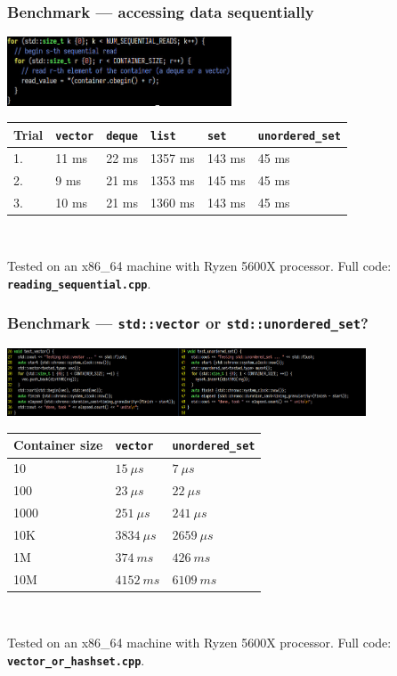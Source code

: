 \documentclass[aspectratio=169]{beamer}
\newcommand{\cpp}[1]{\texttt{\textbf{\textcolor{clCodeBlue}{#1}}}}
\newcommand\fontV{\fontsize{5}{5}\selectfont}
\newcommand\addsource[1]{\fontV\textcolor{clGray}{#1}}
\begin{document}
\begin{frame}
\frametitle{Benchmark --- accessing data sequentially}
\begin{center}
\includegraphics[width=0.5\textwidth]{pictures/code_sequential_access.jpg}\\
\vspace*{16pt}
\begin{tabular}{|l|l|l|l|l|l|}
  \hline
  Trial & \cpp{vector} & \cpp{deque} & \cpp{list} & \cpp{set} & \cpp{unordered\_set} \\
  \hline
  1. & 11 ms & 22 ms & 1357 ms & 143 ms & 45 ms \\
  \hline
  2. & 9 ms & 21 ms & 1353 ms & 145 ms & 45 ms \\
  \hline
  3. & 10 ms & 21 ms & 1360 ms & 143 ms & 45 ms \\
  \hline
\end{tabular}\\
\end{center}
\vspace*{24pt}
\addsource{Tested on an x86\_64 machine with Ryzen 5600X processor. Full code: \cpp{reading\_sequential.cpp}.}
\end{frame}

\begin{frame}
\frametitle{Benchmark --- \cpp{std::vector} or \cpp{std::unordered\_set}?}
\begin{center}
\includegraphics[width=0.8\textwidth]{pictures/code_versus.jpg}\\
\vspace*{16pt}
\begin{tabular}{|l|l|l|}
  \hline
  Container size & \cpp{vector} & \cpp{unordered\_set} \\
  \hline
  10 & $15 \: \mu{}s$ & $7 \: \mu{}s$\\
  \hline
  100 & $23 \: \mu{}s$ & $22 \: \mu{}s$\\
  \hline
  1000 & $251 \: \mu{}s$ & $241 \: \mu{}s$\\
  \hline
  10K & $3834 \: \mu{}s$ & $2659 \: \mu{}s$\\
  \hline
  1M & $374 \: ms$ & $426 \: ms$\\
  \hline
  10M & $4152 \: ms$ & $6109 \: ms$\\
  \hline
\end{tabular}\\
\end{center}
\vspace*{6pt}
\addsource{Tested on an x86\_64 machine with Ryzen 5600X processor. Full code: \cpp{vector\_or\_hashset.cpp}.}
\end{frame}
\end{document}
